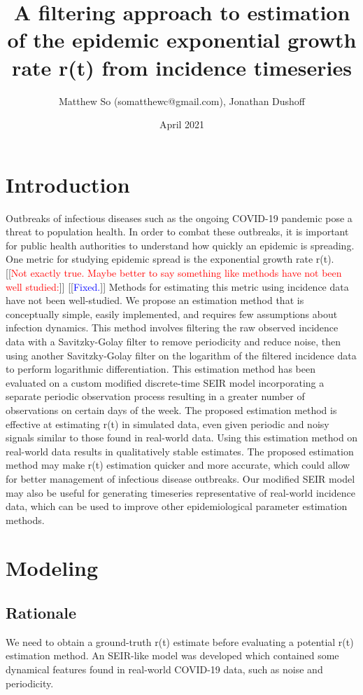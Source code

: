 \documentclass{article}
\title{A filtering approach to estimation of the epidemic exponential growth rate r(t) from incidence timeseries}
\author{Matthew So (somatthewc@gmail.com), Jonathan Dushoff}
\date{April 2021}
\newcommand{\jd}[1]{[[\textcolor{red}{#1}]]}  \newcommand{\msComment}[1]{[[\textcolor{blue}{#1}]]}
\newcommand{\jd}[1]{} \newcommand{\msComment}[1]{}
\begin{document}
\maketitle
\tableofcontents

\section{Introduction}
Outbreaks of infectious diseases such as the ongoing COVID-19 pandemic pose a threat to population health. In order to combat these outbreaks, it is important for public health authorities to understand how quickly an epidemic is spreading. One metric for studying epidemic spread is the exponential growth rate r(t). \jd{Not exactly true. Maybe better to say something like methods have not been well studied:} \msComment{Fixed.} Methods for estimating this metric using incidence data have not been well-studied. We propose an estimation method that is conceptually simple,  easily implemented, and requires few assumptions about infection dynamics. This method involves filtering the raw observed incidence data with a Savitzky-Golay filter to remove periodicity and reduce noise, then using another Savitzky-Golay filter on the logarithm of the filtered incidence data to perform logarithmic differentiation. This estimation method has been evaluated on a custom modified discrete-time SEIR model incorporating a separate periodic observation process resulting in a greater number of observations on certain days of the week. The proposed estimation method is effective at estimating r(t) in simulated data, even given periodic and noisy signals similar to those found in real-world data. Using this estimation method on real-world data results in qualitatively stable estimates. The proposed estimation method may make r(t) estimation quicker and more accurate, which could allow for better management of infectious disease outbreaks. Our modified SEIR model may also be useful for generating timeseries representative of real-world incidence data, which can be used to improve other epidemiological parameter estimation methods.

\section{Modeling}

\subsection{Rationale}
We need to obtain a ground-truth r(t) estimate before evaluating a potential r(t) estimation method. An SEIR-like model was developed which contained some dynamical features found in real-world COVID-19 data, such as noise and periodicity.
\end{document}
